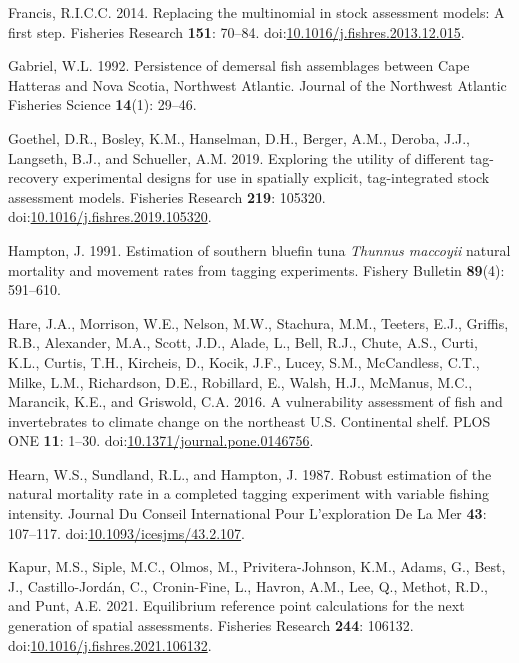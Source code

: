 \documentclass[
]{article}
\newlength{\cslhangindent}
\newlength{\cslentryspacingunit} %
\newenvironment{CSLReferences}[2] %
 {%
  \setlength{\parindent}{0pt}
  \ifodd #1
  \let\oldpar\par
  \def\par{\hangindent=\cslhangindent\oldpar}
  \fi
  \setlength{\parskip}{#2\cslentryspacingunit}
 }%
 {}
\begin{document}
\begin{CSLReferences}{1}{0}
\leavevmode{}%
Francis, R.I.C.C. 2014. Replacing the multinomial in stock assessment models: A first step. Fisheries Research \textbf{151}: 70--84. doi:\href{https://doi.org/10.1016/j.fishres.2013.12.015}{10.1016/j.fishres.2013.12.015}.

\leavevmode{}%
Gabriel, W.L. 1992. Persistence of demersal fish assemblages between {C}ape {H}atteras and {N}ova {S}cotia, {N}orthwest {A}tlantic. Journal of the Northwest Atlantic Fisheries Science \textbf{14}(1): 29--46.

\leavevmode{}%
Goethel, D.R., Bosley, K.M., Hanselman, D.H., Berger, A.M., Deroba, J.J., Langseth, B.J., and Schueller, A.M. 2019. Exploring the utility of different tag-recovery experimental designs for use in spatially explicit, tag-integrated stock assessment models. Fisheries Research \textbf{219}: 105320. doi:\href{https://doi.org/10.1016/j.fishres.2019.105320}{10.1016/j.fishres.2019.105320}.

\leavevmode{}%
Hampton, J. 1991. Estimation of southern bluefin tuna \emph{{T}hunnus maccoyii} natural mortality and movement rates from tagging experiments. Fishery Bulletin \textbf{89}(4): 591--610.

\leavevmode{}%
Hare, J.A., Morrison, W.E., Nelson, M.W., Stachura, M.M., Teeters, E.J., Griffis, R.B., Alexander, M.A., Scott, J.D., Alade, L., Bell, R.J., Chute, A.S., Curti, K.L., Curtis, T.H., Kircheis, D., Kocik, J.F., Lucey, S.M., McCandless, C.T., Milke, L.M., Richardson, D.E., Robillard, E., Walsh, H.J., McManus, M.C., Marancik, K.E., and Griswold, C.A. 2016. A vulnerability assessment of fish and invertebrates to climate change on the northeast {U}.{S}. Continental shelf. PLOS ONE \textbf{11}: 1--30. doi:\href{https://doi.org/10.1371/journal.pone.0146756}{10.1371/journal.pone.0146756}.

\leavevmode{}%
Hearn, W.S., Sundland, R.L., and Hampton, J. 1987. Robust estimation of the natural mortality rate in a completed tagging experiment with variable fishing intensity. Journal Du Conseil International Pour L'exploration De La Mer \textbf{43}: 107--117. doi:\href{https://doi.org/10.1093/icesjms/43.2.107}{10.1093/icesjms/43.2.107}.

\leavevmode{}%
Kapur, M.S., Siple, M.C., Olmos, M., Privitera-Johnson, K.M., Adams, G., Best, J., Castillo-Jordán, C., Cronin-Fine, L., Havron, A.M., Lee, Q., Methot, R.D., and Punt, A.E. 2021. Equilibrium reference point calculations for the next generation of spatial assessments. Fisheries Research \textbf{244}: 106132. doi:\href{https://doi.org/10.1016/j.fishres.2021.106132}{10.1016/j.fishres.2021.106132}.


\end{CSLReferences}
\end{document}
